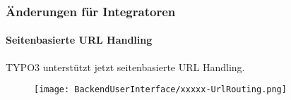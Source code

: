 
\begin{frame}[fragile]
	\frametitle{Änderungen für Integratoren}
	\framesubtitle{Seitenbasierte URL Handling}

 	TYPO3 unterstützt jetzt seitenbasierte URL Handling.

	\begin{figure}
		\texttt{[image: BackendUserInterface/xxxxx-UrlRouting.png]}
	\end{figure}

\end{frame}



%
%

